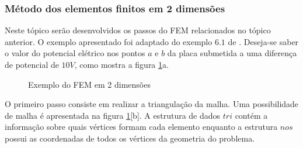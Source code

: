 \documentclass[
    12pt,               %
    openright,          %
    oneside,
    a4paper,            %
    english,            %
    french,             %
    spanish,            %
    brazil              %
    ]{abntex2}
\begin{document}
\subsubsection*{Método dos elementos finitos em 2 dimensões}
\label{sec:fem2d}
Neste tópico serão desenvolvidos os passos do FEM relacionados no tópico anterior. O exemplo apresentado foi adaptado do exemplo $6.1$ de . Deseja-se saber o valor do potencial elétrico nos pontos $a$ e $b$ da placa submetida a uma diferença de potencial de $10V$, como mostra a figura \ref{fig:exemplo}{a}.

\begin{figure}%
	\centering
	\qquad
	\caption{Exemplo do FEM em 2 dimensões}%
	\label{fig:exemplo}%
\end{figure}

O primeiro passo consiste em realizar a triangulação da malha. Uma possibilidade de malha é apresentada na figura \ref{fig:exemplo}[b]. A estrutura de dados $tri$ contém a informação sobre quais vértices formam cada elemento enquanto a estrutura $nos$ possui as coordenadas de todos os vértices da geometria do problema. 
\end{document}
